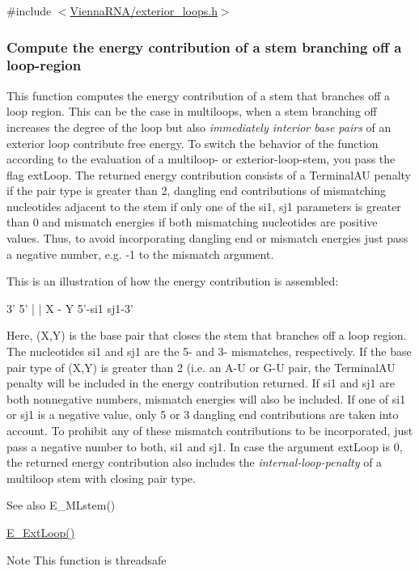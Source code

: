 {\ttfamily \#include $<$\hyperlink{exterior__loops_8h}{Vienna\+R\+N\+A/exterior\+\_\+loops.\+h}$>$}

\subsubsection*{Compute the energy contribution of a stem branching off a loop-\/region}

This function computes the energy contribution of a stem that branches off a loop region. This can be the case in multiloops, when a stem branching off increases the degree of the loop but also {\itshape immediately interior base pairs} of an exterior loop contribute free energy. To switch the behavior of the function according to the evaluation of a multiloop-\/ or exterior-\/loop-\/stem, you pass the flag \textquotesingle{}ext\+Loop\textquotesingle{}. The returned energy contribution consists of a Terminal\+AU penalty if the pair type is greater than 2, dangling end contributions of mismatching nucleotides adjacent to the stem if only one of the si1, sj1 parameters is greater than 0 and mismatch energies if both mismatching nucleotides are positive values. Thus, to avoid incorporating dangling end or mismatch energies just pass a negative number, e.\+g. -\/1 to the mismatch argument.

This is an illustration of how the energy contribution is assembled\+: 
\begin{DoxyPre}
      3'  5'
      |   |
      X - Y
5'-si1     sj1-3'
\end{DoxyPre}


Here, (X,Y) is the base pair that closes the stem that branches off a loop region. The nucleotides si1 and sj1 are the 5\textquotesingle{}-\/ and 3\textquotesingle{}-\/ mismatches, respectively. If the base pair type of (X,Y) is greater than 2 (i.\+e. an A-\/U or G-\/U pair, the Terminal\+AU penalty will be included in the energy contribution returned. If si1 and sj1 are both nonnegative numbers, mismatch energies will also be included. If one of si1 or sj1 is a negative value, only 5\textquotesingle{} or 3\textquotesingle{} dangling end contributions are taken into account. To prohibit any of these mismatch contributions to be incorporated, just pass a negative number to both, si1 and sj1. In case the argument ext\+Loop is 0, the returned energy contribution also includes the {\itshape internal-\/loop-\/penalty} of a multiloop stem with closing pair type.

\begin{DoxySeeAlso}{See also}
E\+\_\+\+M\+Lstem() 

\hyperlink{group__loops_ga05c6288c5a79d3bd5ad6d33c1bb34bd0}{E\+\_\+\+Ext\+Loop()} 
\end{DoxySeeAlso}
\begin{DoxyNote}{Note}
This function is threadsafe
\end{DoxyNote}

